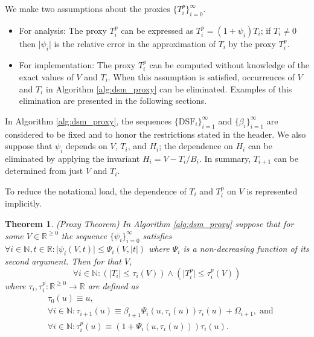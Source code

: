\documentclass[10pt]{article}
\newtheorem{thm}{Theorem}[section]
\theoremstyle{definition}
\theoremstyle{remark}
\numberwithin{equation}{section}
\newcommand{\dsf}{\text{DSF}}
\newcommand{\nats}{\mathbb{N}}
\newcommand{\reals}{\mathbb{R}}
\newcommand{\nnreals}{\mathbb{R}^{\ge0}}
\newcommand{\abs}[1]{\lvert #1 \rvert}
\begin{document}
We make two assumptions about the proxies $\{T^p_i\}_{i=0}^\infty$.
\begin{itemize}[nosep]
\item For analysis: The proxy $T_i^p$ can be expressed as $T^p_i = (1+\psi_i) T_i$; if $T_i \ne 0$ then $\abs{\psi_i}$ is the relative error in the approximation of $T_i$ by the proxy $T^p_i$. 
\item For implementation: The proxy $T_i^p$ can be computed without knowledge of the exact values of $V$ and $T_i$. When this assumption is satisfied, occurrences of $V$ and $T_i$ in Algorithm \ref{alg:dsm_proxy} can be eliminated. 
Examples of this elimination are presented in the following sections.
\end{itemize}

In Algorithm \ref{alg:dsm_proxy}, the sequences $\{\dsf_i\}_{i=1}^\infty$ and $\{\beta_i\}_{i=1}^\infty$ are considered to be fixed and to honor the restrictions stated in the header. 
We also suppose that $\psi_i$ depends on $V$, $T_i$, and $H_i$; the dependence on $H_i$ can be eliminated by applying the invariant $H_i = V - T_i/B_i$. In summary, $T_{i+1}$ can be determined from just $V$ and $T_i$.

To reduce the notational load, the dependence of $T_i$ and $T_i^p$ on $V$ is represented implicitly. 

\begin{thm}
	\label{thm:proxy_theorem} (Proxy Theorem) In Algorithm \ref{alg:dsm_proxy} suppose that for some $V \in \nnreals$ the sequence $\{\psi_i\}_{i=0}^\infty$ satisfies $\forall i\in\nats, t \in \reals: \abs{\psi_i(V,t)} \le \Psi_i(V,\abs{t})$ where $\Psi_i$ is a non-decreasing function of its second argument. Then for that $V$,
    \[
    \forall i \in \nats: \left(\abs{T_i} \le \tau_i(V)\right) \wedge \left(\abs{T^p_i} \le \tau_i^p(V)\right)
    \]
    where $\tau_i, \tau_i^p : \nnreals \rightarrow \reals$ are defined as
	\begin{align*}
    &\tau_0(u) \equiv u, \\
    &\forall i \in \nats: \tau_{i+1}(u) \equiv \beta_{i+1} \Psi_i(u,\tau_i(u)) \tau_i(u) + \Omega_{i+1} ,  \;\text{and} \\[3pt]
    &\forall i \in \nats: \tau_i^p(u) \equiv (1+\Psi_i(u,\tau_i(u))) \tau_i(u) .
   \end{align*}
\end{thm}
\end{document}
